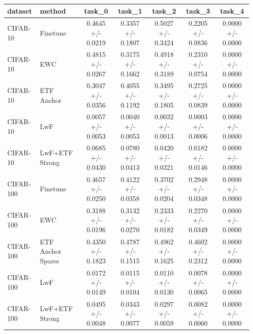 \begin{tabular}{llccccc}
\hline
dataset & method & task\_0 & task\_1 & task\_2 & task\_3 & task\_4 \\
\hline
CIFAR-10 & Finetune & 0.4645 +/- 0.0219 & 0.3357 +/- 0.1807 & 0.5027 +/- 0.3424 & 0.2205 +/- 0.0836 & 0.0000 +/- 0.0000 \\
CIFAR-10 & EWC & 0.4815 +/- 0.0267 & 0.3175 +/- 0.1662 & 0.4918 +/- 0.3189 & 0.2310 +/- 0.0754 & 0.0000 +/- 0.0000 \\
CIFAR-10 & ETF Anchor & 0.3047 +/- 0.0356 & 0.4055 +/- 0.1192 & 0.3495 +/- 0.1805 & 0.2725 +/- 0.0839 & 0.0000 +/- 0.0000 \\
CIFAR-10 & LwF & 0.0057 +/- 0.0053 & 0.0040 +/- 0.0053 & 0.0032 +/- 0.0013 & 0.0003 +/- 0.0006 & 0.0000 +/- 0.0000 \\
CIFAR-10 & LwF+ETF Strong & 0.0685 +/- 0.0430 & 0.0780 +/- 0.0413 & 0.0420 +/- 0.0321 & 0.0182 +/- 0.0146 & 0.0000 +/- 0.0000 \\
CIFAR-100 & Finetune & 0.4657 +/- 0.0250 & 0.4122 +/- 0.0358 & 0.3702 +/- 0.0204 & 0.2948 +/- 0.0348 & 0.0000 +/- 0.0000 \\
CIFAR-100 & EWC & 0.3188 +/- 0.0196 & 0.3132 +/- 0.0270 & 0.2333 +/- 0.0182 & 0.2270 +/- 0.0349 & 0.0000 +/- 0.0000 \\
CIFAR-100 & ETF Anchor Sparse & 0.4350 +/- 0.1823 & 0.4787 +/- 0.1515 & 0.4962 +/- 0.1625 & 0.4602 +/- 0.2312 & 0.0000 +/- 0.0000 \\
CIFAR-100 & LwF & 0.0172 +/- 0.0149 & 0.0115 +/- 0.0104 & 0.0110 +/- 0.0130 & 0.0078 +/- 0.0065 & 0.0000 +/- 0.0000 \\
CIFAR-100 & LwF+ETF Strong & 0.0495 +/- 0.0048 & 0.0343 +/- 0.0077 & 0.0297 +/- 0.0059 & 0.0082 +/- 0.0060 & 0.0000 +/- 0.0000 \\
\hline
\end{tabular}
